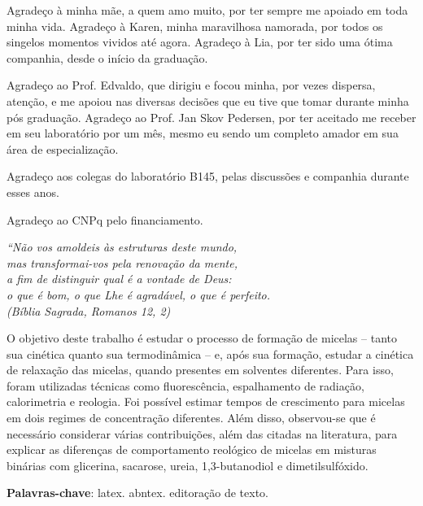 \documentclass[
	12pt,				%
	openright,			%
	twoside,			%
	a4paper,			%
	english,			%
	brazil%
	]{abntex2}
\begin{document}
\begin{agradecimentos}

Agradeço à minha mãe, a quem amo muito, por ter sempre me apoiado em toda minha vida. Agradeço à Karen, minha maravilhosa namorada, por todos os singelos momentos vividos até agora. Agradeço à Lia, por ter sido uma ótima companhia, desde o início da graduação.

Agradeço ao Prof. Edvaldo, que dirigiu e focou minha, por vezes dispersa, atenção, e me apoiou nas diversas decisões que eu tive que tomar durante minha pós graduação. Agradeço ao Prof. Jan Skov Pedersen, por ter aceitado me receber em seu laboratório por um mês, mesmo eu sendo um completo amador em sua área de especialização.

Agradeço aos colegas do laboratório B145, pelas discussões e companhia durante esses anos.

Agradeço ao CNPq pelo financiamento.

\end{agradecimentos}

\begin{epigrafe}
    \vspace*{\fill}
	\begin{flushright}
		\textit{``Não vos amoldeis às estruturas deste mundo, \\
		mas transformai-vos pela renovação da mente, \\
		a fim de distinguir qual é a vontade de Deus: \\
		o que é bom, o que Lhe é agradável, o que é perfeito.\\
		(Bíblia Sagrada, Romanos 12, 2)}
	\end{flushright}
\end{epigrafe}


\setlength{\absparsep}{18pt} %
\begin{resumo}
 O objetivo deste trabalho é estudar o processo de formação de micelas -- tanto sua cinética quanto sua termodinâmica -- e, após sua formação, estudar a cinética de relaxação das micelas, quando presentes em solventes diferentes. Para isso, foram utilizadas técnicas como fluorescência, espalhamento de radiação, calorimetria e reologia. Foi possível estimar tempos de crescimento para micelas em dois regimes de concentração diferentes. Além disso, observou-se que é necessário considerar várias contribuições, além das citadas na literatura, para explicar as diferenças de comportamento reológico de micelas em misturas binárias com glicerina, sacarose, ureia, 1,3-butanodiol e dimetilsulfóxido.

 \textbf{Palavras-chave}: latex. abntex. editoração de texto.
\end{resumo}
\end{document}
